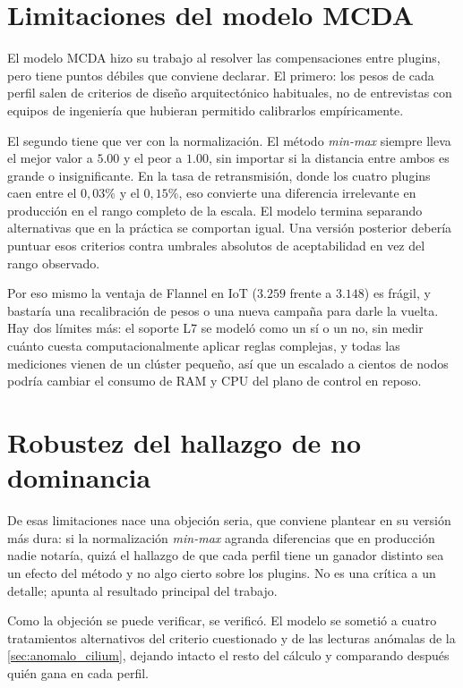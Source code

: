 \section{Limitaciones del modelo MCDA} \label{sec:limitaciones_mcda}
El modelo MCDA hizo su trabajo al resolver las compensaciones entre plugins, pero tiene puntos débiles que conviene declarar. El primero: los pesos de cada perfil salen de criterios de diseño arquitectónico habituales, no de entrevistas con equipos de ingeniería que hubieran permitido calibrarlos empíricamente.

El segundo tiene que ver con la normalización. El método \emph{min-max} siempre lleva el mejor valor a $5.00$ y el peor a $1.00$, sin importar si la distancia entre ambos es grande o insignificante. En la tasa de retransmisión, donde los cuatro plugins caen entre el $0{,}03\%$ y el $0{,}15\%$, eso convierte una diferencia irrelevante en producción en el rango completo de la escala. El modelo termina separando alternativas que en la práctica se comportan igual. Una versión posterior debería puntuar esos criterios contra umbrales absolutos de aceptabilidad en vez del rango observado.

Por eso mismo la ventaja de Flannel en IoT ($3.259$ frente a $3.148$) es frágil, y bastaría una recalibración de pesos o una nueva campaña para darle la vuelta. Hay dos límites más: el soporte L7 se modeló como un sí o un no, sin medir cuánto cuesta computacionalmente aplicar reglas complejas, y todas las mediciones vienen de un clúster pequeño, así que un escalado a cientos de nodos podría cambiar el consumo de RAM y CPU del plano de control en reposo.

\section{Robustez del hallazgo de no dominancia} \label{sec:robustez_mcda}

De esas limitaciones nace una objeción seria, que conviene plantear en su versión más dura: si la normalización \emph{min-max} agranda diferencias que en producción nadie notaría, quizá el hallazgo de que cada perfil tiene un ganador distinto sea un efecto del método y no algo cierto sobre los plugins. No es una crítica a un detalle; apunta al resultado principal del trabajo.

Como la objeción se puede verificar, se verificó. El modelo se sometió a cuatro tratamientos alternativos del criterio cuestionado y de las lecturas anómalas de la \cref{sec:anomalo_cilium}, dejando intacto el resto del cálculo y comparando después quién gana en cada perfil.

